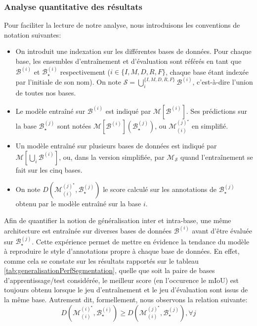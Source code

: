 \subsubsection{Analyse quantitative des résultats}
Pour faciliter la lecture de notre analyse, nous introduisons les conventions de notation suivantes:
\begin{itemize}
	\item On introduit une indexation sur les différentes bases de données. Pour chaque base, les ensembles d'entraînement et d'évaluation sont référés en tant que  $\mathcal{B}^{(i)}$ et $\mathcal{B}^{(i)}_{\star}$ respectivement ($i  \in  \{I, M, D, R, F\}$, chaque base étant indexée par l'initiale de son nom). On note $\mathcal{S} = \bigcup_i^{\{I, M, D, R, F\}} \mathcal{B}^{(i)}$, c'est-à-dire l'union de toutes nos bases.
	\item Le modèle entraîné sur $\mathcal{B}^{(i)}$ est indiqué par $\mathcal{M}[\mathcal{B}^{(i)}]$. Ses prédictions sur la base $\mathcal{B}^{(j)}_{\star}$ sont notées $\mathcal{M}[\mathcal{B}^{(i)}](\mathcal{B}^{(j)}_{\star})$, ou $\mathcal{M}_{(i)}^{(j)^\star}$ en simplifié.
	\item Un modèle entraîné sur plusieurs bases de données est indiqué par $\mathcal{M}[\bigcup_i \mathcal{B}^{(i)}]$, ou, dans la version simplifiée, par $\mathcal{M}_\mathcal{S}$ quand l'entraînement se fait sur les cinq bases. 
	\item On note $D(\mathcal{M}_{(i)}^{(j)^\star}, \mathcal{B}^{(j)}_{\star})$ le score calculé sur les annotations de $\mathcal{B}^{(j)}_{\star}$ obtenu par le modèle entraîné sur la base $i$.
\end{itemize}

Afin de quantifier la notion de généralisation inter et intra-base, une même architecture est entraînée sur diverses bases de données $\mathcal{B}^{(i)}$ avant d'être évaluée sur $\mathcal{B}^{(j)}_{\star}$. Cette expérience permet de mettre en évidence la tendance du modèle à reproduire le style d'annotations propre à chaque base de données. En effet, comme cela se constate sur les résultats rapportés sur le tableau \ref{tab:generalisationPerfSegmentation}, quelle que soit la paire de bases d'apprentissage/test considérée, le meilleur score (en l'occurence le \ac{mIoU}) est toujours obtenu lorsque le jeu d'entraînement et le jeu d'évaluation sont issus de la même base. Autrement dit, formellement, nous observons la relation suivante:
\begin{equation}
	D(\mathcal{M}_{(i)}^{(i)^\star}, \mathcal{B}^{(i)}_{\star}) \geq D(\mathcal{M}_{(i)}^{(j)^\star}, \mathcal{B}^{(j)}_{\star}), \forall j
\end{equation}

